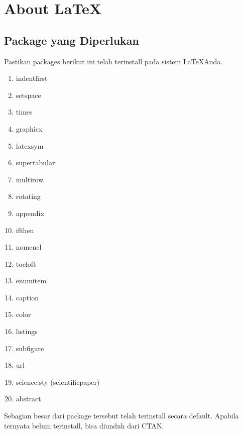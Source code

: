 \chapter{About \LaTeX}

\section{Package yang Diperlukan}
Pastikan packages berikut ini telah terinstall pada sistem \LaTeX Anda.

\begin{enumerate}
    \item indentfirst

\item setspace
\item times
\item graphicx
\item latexsym
\item supertabular
\item multirow
\item rotating
\item appendix
\item ifthen
\item nomencl
\item tocloft
\item enumitem
\item caption
\item color
\item listings
\item subfigure
\item url
\item science.sty (scientificpaper)
\item abstract
\end{enumerate}

Sebagian besar dari package tersebut telah terinstall secara default. Apabila ternyata belum terinstall, bisa diunduh dari CTAN.

